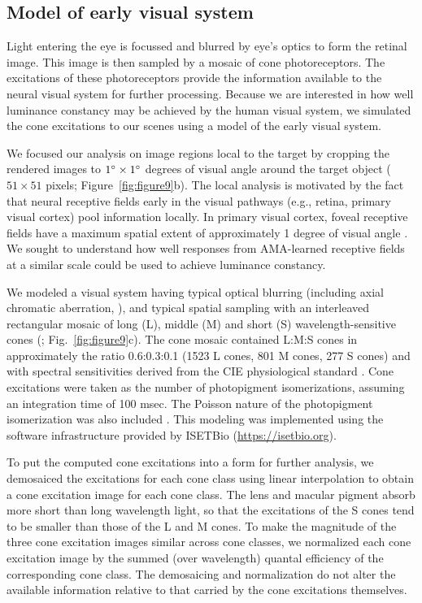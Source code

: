 \documentclass{jov}
\begin{document}
\subsection{Model of early visual system} \label{method:Isetbio}
Light entering the eye is focussed and blurred by eye's optics to form the retinal image.
This image is then sampled by a mosaic of cone photoreceptors.
The excitations of these photoreceptors provide the information available to the neural visual system for further processing.
Because we are interested in how well luminance constancy may be achieved by the human visual system, we simulated the cone excitations
to our scenes using a model of the early visual system.

We focused our analysis on image regions local to the target by cropping the rendered images to $1\degree \times 1\degree$ degrees of visual angle around the target object ($51 \times 51$ pixels; Figure~\ref{fig:figure9}b).
The local analysis is motivated by the fact that neural receptive fields early in the visual pathways (e.g., retina, primary visual cortex) pool information locally. 
In primary visual cortex, foveal receptive fields have a maximum spatial extent of approximately 1 degree of visual angle \cite{gattass1981visual, gattass1988visuotopic}. 
We sought to understand how well responses from AMA-learned receptive fields at a similar scale could be used to achieve luminance constancy.

We modeled a visual system having typical optical blurring (including axial chromatic aberration, ), and typical spatial sampling with an interleaved rectangular mosaic of long (L), middle (M)  and short (S) wavelength-sensitive cones (; Fig.~\ref{fig:figure9}c). 
The cone mosaic contained L:M:S cones in approximately the ratio 0.6:0.3:0.1 (1523 L cones, 801 M cones, 277 S cones) and with spectral sensitivities derived from the CIE physiological standard \cite{CIE86}.
Cone excitations were taken as the number of photopigment isomerizations, assuming an integration time of 100 msec. 
The Poisson nature of the photopigment isomerization was also included \cite{hecht1942energy}. 
This modeling was implemented using the software infrastructure provided by ISETBio (\href{https://isetbio.org}{https://isetbio.org}).

To put the computed cone excitations into a form for further analysis, we demosaiced the excitations for each cone class using linear interpolation
to obtain a cone excitation image for each cone class.
The lens and macular pigment absorb more short than long wavelength light, so that the excitations of the S cones tend to be
smaller than those of the L and M cones.
To make the magnitude of the three cone excitation images similar across cone classes, we
normalized each cone excitation image by the summed (over wavelength) quantal efficiency of the corresponding cone class.
The demosaicing and normalization do not alter the available information relative to that carried by the cone excitations themselves. 
\end{document}
